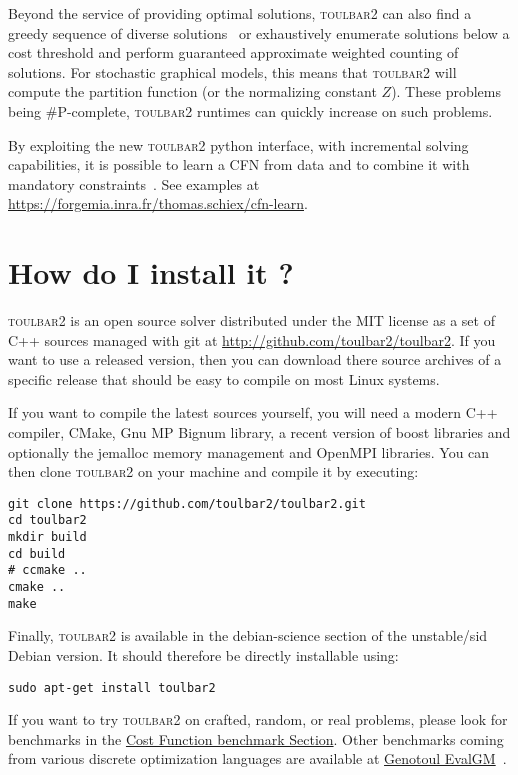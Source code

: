 \documentclass{article}
\def\toulbar2{\textsc{toulbar2}}
\begin{document}
Beyond the service of providing optimal solutions, \toulbar2 can also find a greedy sequence of diverse solutions~\cite{Ruffini19a} or
exhaustively enumerate solutions below a cost threshold and
perform guaranteed approximate weighted counting of solutions. For
stochastic graphical models, this means that \toulbar2 will compute
the partition function (or the normalizing constant $Z$). These
problems being \#P-complete, \toulbar2 runtimes can quickly increase
on such problems.

By exploiting the new \toulbar2 python interface, with incremental solving capabilities, it is possible to learn a CFN from data and to combine it with mandatory constraints~\cite{Schiex20b}. 
See examples at \url{https://forgemia.inra.fr/thomas.schiex/cfn-learn}. 

\section{How do I install it ?}


\toulbar2 is an open source solver distributed under the MIT license as a set of C++ sources managed with git at
\url{http://github.com/toulbar2/toulbar2}. If you want
to use a released version, then you can download there source archives of a specific release
that should be easy to
compile on most Linux systems.

If you want to compile the latest sources yourself, you will need a modern C++
compiler, CMake, Gnu MP Bignum library, a recent version of boost
libraries and optionally the jemalloc memory management and OpenMPI libraries. You
can then clone \toulbar2 on your machine and compile it by executing:

\begin{verbatim}
git clone https://github.com/toulbar2/toulbar2.git
cd toulbar2
mkdir build
cd build
# ccmake ..
cmake ..
make
\end{verbatim}

Finally, \toulbar2 is available in the debian-science
section of the unstable/sid Debian version. It should therefore be
directly installable using:

\begin{verbatim}
sudo apt-get install toulbar2
\end{verbatim}

If you want to try \toulbar2 on crafted, random, or real problems,
please look for benchmarks in the
\href{http://costfunction.org/en/benchmark}{Cost
  Function benchmark Section}. Other benchmarks coming from various discrete optimization languages are available at \href{http://genoweb.toulouse.inra.fr/~degivry/evalgm}{Genotoul EvalGM}~\cite{Hurley16b}.
\end{document}
